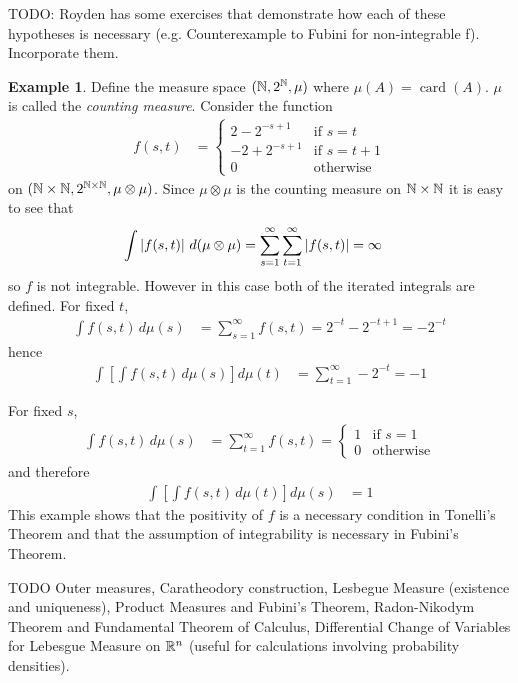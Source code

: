 \documentclass{amsart}
\DeclareMathOperator*{\card}{card}
\theoremstyle{remark}
\theoremstyle{definition}
\newtheorem{examp}[thm]{Example}
\begin{document}
TODO: Royden has some exercises that demonstrate how each of these
hypotheses is necessary (e.g. Counterexample to Fubini for
non-integrable f).  Incorporate them.
\begin{examp}Define the measure space $(\mathbb{N}, 2^{\mathbb{N}},
  \mu)$ where $\mu(A) = \card(A)$.  $\mu$ is called the \emph{counting
    measure}.  
Consider the function 
\begin{align*}
f(s,t) &= \begin{cases}
2 - 2^{-s+1} & \text{if $s=t$}\\
-2 + 2^{-s+1} & \text{if $s = t + 1$} \\
0 & \text{otherwise}
\end{cases}
\end{align*}
on $(\mathbb{N} \times \mathbb{N}, 2^{\mathbb{N} \times \mathbb{N}}, \mu
\otimes \mu)$.  Since $\mu \otimes \mu$ is the counting measure on
$\mathbb{N} \times \mathbb{N}$ it is easy to see that 
\begin{align*}
\int \left \vert f(s,t) \right \vert \, d ( \mu \otimes \mu) &= \sum_{s=1}^\infty
\sum_{t=1}^\infty \left \vert f(s,t) \right \vert = \infty
\end{align*}
so $f$ is not integrable.  However in this case both of the iterated
integrals are defined.
For fixed $t$, 
\begin{align*}
\int f(s,t) \, d\mu(s) &=
\sum_{s=1}^\infty f(s,t) = 2^{-t} - 2^{-t+1} = -2^{-t}
\end{align*}
hence 
\begin{align*}
\int \left [ \int f(s,t) \, d\mu(s) \right ] d \mu(t) &=
\sum_{t=1}^\infty -2^{-t} = -1
\end{align*}

For fixed $s$, 
\begin{align*}
\int f(s,t) \, d\mu(s) &=
\sum_{t=1}^\infty f(s,t) = \begin{cases}
1 & \text {if $s=1$}\\
0 & \text {otherwise}
\end{cases}
\end{align*}
and therefore 
\begin{align*}
\int \left [ \int f(s,t) \, d\mu(t) \right ] d \mu(s) &= 1
\end{align*}
This example shows that the positivity of $f$ is a necessary condition
in Tonelli's Theorem and that the assumption of integrability is
necessary in Fubini's Theorem.
\end{examp}


TODO
Outer measures, Caratheodory construction, Lesbegue Measure (existence
and uniqueness), Product Measures and Fubini's Theorem, Radon-Nikodym Theorem and
Fundamental Theorem of Calculus, Differential Change of Variables for
Lebesgue Measure on $\mathbb{R}^n$ (useful for calculations involving
probability densities).
\end{document}
